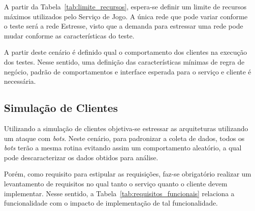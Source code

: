 A partir da Tabela~\ref{tab:limite_recursos}, espera-se definir um limite de recursos máximos utilizados pelo Serviço de Jogo.
%
A única rede que pode variar conforme o teste será a rede Estresse, visto que a demanda para estressar uma rede pode mudar conforme as características do teste.

A partir deste cenário é definido qual o comportamento dos clientes na execução dos testes.
%
Nesse sentido, uma definição das características mínimas de regra de negócio, padrão de comportamentos e interface esperada para o serviço e cliente é necessária.



\subsection{Simulação de Clientes}
\label{sec:SimulaCliente}



Utilizando a simulação de clientes objetiva-se estressar as arquiteturas utilizando um ataque com \textit{bots}.
%
Neste cenário, para padronizar a coleta de dados, todos os \textit{bots} terão a mesma rotina evitando assim um comportamento aleatório, a qual pode descaracterizar os dados obtidos para análise.



Porém, como requisito para estipular as requisições, faz-se obrigatório realizar um levantamento de requisitos no qual tanto o serviço quanto o cliente devem implementar.
%
Nesse sentido, a Tabela~\ref{tab:requisitos_funcionais} relaciona a funcionalidade com o impacto de implementação de tal funcionalidade.



